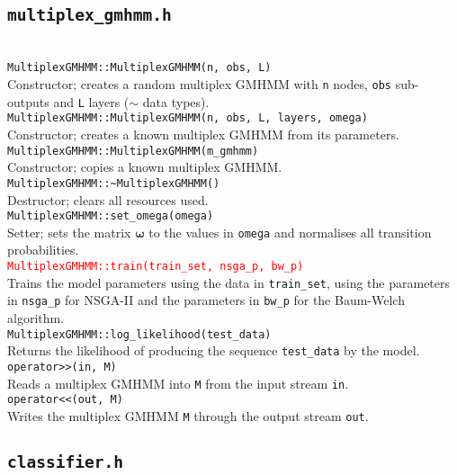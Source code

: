 \documentclass[12pt,openany]{article}
\newcommand{\fundef}[1]{\\\indent\indent\texttt{#1}\\}
\begin{document}
	\subsection{\tt multiplex\_gmhmm.h}
	\hfill\vspace*{-10pt}\fundef{MultiplexGMHMM::MultiplexGMHMM(n, obs, L)}
	Constructor; creates a random multiplex GMHMM with {\tt n} nodes, {\tt obs} sub-outputs and {\tt L} layers ($\sim$ data types).
	\fundef{MultiplexGMHMM::MultiplexGMHMM(n, obs, L, layers, omega)}
	Constructor; creates a known multiplex GMHMM from its parameters.
	\fundef{MultiplexGMHMM::MultiplexGMHMM(m\_gmhmm)}
	Constructor; copies a known multiplex GMHMM.	
	\fundef{MultiplexGMHMM::\textasciitilde MultiplexGMHMM()}
	Destructor; clears all resources used.
	\fundef{MultiplexGMHMM::set\_omega(omega)}
	Setter; sets the matrix $\boldsymbol\omega$ to the values in {\tt omega} and normalises all transition probabilities.
	\textcolor{red}{\fundef{MultiplexGMHMM::train(train\_set, nsga\_p, bw\_p)}}
	Trains the model parameters using the data in {\tt train\_set}, using the parameters in {\tt nsga\_p} for NSGA-II and the parameters in {\tt bw\_p} for the Baum-Welch algorithm.
	\fundef{MultiplexGMHMM::log\_likelihood(test\_data)}
	Returns the likelihood of producing the sequence {\tt test\_data} by the model.
	\fundef{operator>\/>(in, M)}
	Reads a multiplex GMHMM into {\tt M} from the input stream {\tt in}.
	\fundef{operator<\/<(out, M)}
	Writes the multiplex GMHMM {\tt M} through the output stream {\tt out}.
		
	\subsection{\tt classifier.h}\label{sec:classhdr}
	
\end{document}
